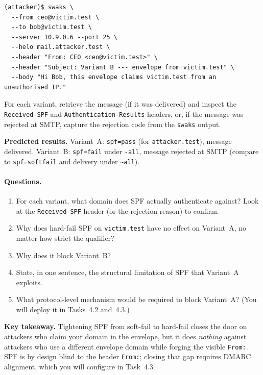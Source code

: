 \documentclass[11pt]{article}
\begin{document}
\begin{listing}[H]
\begin{verbatim}
(attacker)$ swaks \
  --from ceo@victim.test \
  --to bob@victim.test \
  --server 10.9.0.6 --port 25 \
  --helo mail.attacker.test \
  --header "From: CEO <ceo@victim.test>" \
  --header "Subject: Variant B --- envelope from victim.test" \
  --body "Hi Bob, this envelope claims victim.test from an unauthorised IP."
\end{verbatim}
\end{listing}

For each variant, retrieve the message (if it was delivered) and inspect
the \texttt{Received-SPF} and \texttt{Authentication-Results} headers,
or, if the message was rejected at SMTP, capture the rejection code
from the \texttt{swaks} output.

\begin{infobox}
\textbf{Predicted results.}
Variant~A: \texttt{spf=pass} (for \texttt{attacker.test}), message
delivered.
Variant~B: \texttt{spf=fail} under \texttt{-all}, message rejected at
SMTP (compare to \texttt{spf=softfail} and delivery under
\texttt{\textasciitilde all}).
\end{infobox}

\paragraph{Questions.}
\begin{enumerate}[noitemsep]
  \item For each variant, what domain does SPF actually authenticate
        against? Look at the \texttt{Received-SPF} header (or the
        rejection reason) to confirm.
  \item Why does hard-fail SPF on \texttt{victim.test} have no effect
        on Variant~A, no matter how strict the qualifier?
  \item Why does it block Variant~B?
  \item State, in one sentence, the structural limitation of SPF that
        Variant~A exploits.
  \item What protocol-level mechanism would be required to block
        Variant~A? (You will deploy it in Tasks~4.2 and~4.3.)
\end{enumerate}

\begin{notebox}
\textbf{Key takeaway.} Tightening SPF from soft-fail to hard-fail closes
the door on attackers who claim your domain in the envelope, but it
does \emph{nothing} against attackers who use a different envelope
domain while forging the visible \texttt{From:}. SPF is by design
blind to the header \texttt{From:}; closing that gap requires DMARC
alignment, which you will configure in Task~4.3.
\end{notebox}
\end{document}
